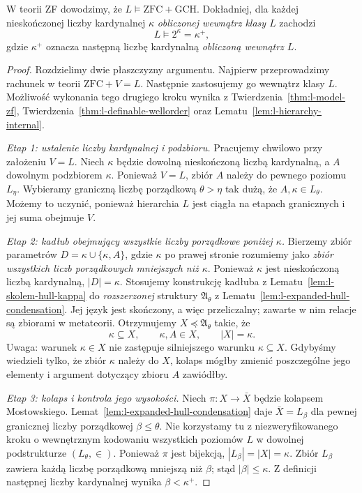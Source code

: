 \begin{twierdzenie}
\label{thm:l-gch}
W teorii ZF dowodzimy, że $L\models\mathrm{ZFC}+\mathrm{GCH}$.
Dokładniej, dla każdej nieskończonej liczby kardynalnej
$\kappa$ \emph{obliczonej wewnątrz klasy $L$} zachodzi
\[
 L\models 2^\kappa=\kappa^+,
\]
gdzie $\kappa^+$ oznacza następną liczbę kardynalną
\emph{obliczoną wewnątrz $L$}.
\end{twierdzenie}
\begin{proof}
Rozdzielimy dwie płaszczyzny argumentu. Najpierw
przeprowadzimy rachunek w teorii $\mathrm{ZFC}+V=L$.
Następnie zastosujemy go wewnątrz klasy $L$.
Możliwość wykonania tego drugiego kroku wynika
z Twierdzenia~\ref{thm:l-model-zf},
Twierdzenia~\ref{thm:l-definable-wellorder} oraz
Lematu~\ref{lem:l-hierarchy-internal}.

\emph{Etap 1: ustalenie liczby kardynalnej i podzbioru.}
Pracujemy chwilowo przy założeniu $V=L$. Niech $\kappa$
będzie dowolną nieskończoną liczbą kardynalną,
a $A$ dowolnym podzbiorem $\kappa$. Ponieważ $V=L$,
zbiór $A$ należy do pewnego poziomu $L_\eta$.
Wybieramy graniczną liczbę porządkową $\theta>\eta$
tak dużą, że $A,\kappa\in L_\theta$.
Możemy to uczynić, ponieważ hierarchia $L$ jest
ciągła na etapach granicznych i jej suma obejmuje $V$.

\emph{Etap 2: kadłub obejmujący wszystkie liczby
porządkowe poniżej $\kappa$.}
Bierzemy zbiór parametrów
$D=\kappa\cup\{\kappa,A\}$, gdzie $\kappa$ po prawej
stronie rozumiemy jako \emph{zbiór wszystkich liczb
porządkowych mniejszych niż $\kappa$}.
Ponieważ $\kappa$ jest nieskończoną liczbą kardynalną,
$|D|=\kappa$. Stosujemy konstrukcję kadłuba z
Lematu~\ref{lem:l-skolem-hull-kappa} do
\emph{rozszerzonej} struktury $\mathfrak A_\theta$
z Lematu~\ref{lem:l-expanded-hull-condensation}.
Jej język jest skończony, a więc przeliczalny;
zawarte w nim relacje są zbiorami w metateorii.
Otrzymujemy $X\preccurlyeq\mathfrak A_\theta$ takie, że
\[
 \kappa\subseteq X,\qquad \kappa,A\in X,
 \qquad |X|=\kappa.
\]
Uwaga: warunek $\kappa\in X$ nie zastępuje
silniejszego warunku $\kappa\subseteq X$.
Gdybyśmy wiedzieli tylko, że zbiór $\kappa$ należy
do $X$, kolaps mógłby zmienić poszczególne jego
elementy i argument dotyczący zbioru $A$ zawiódłby.

\emph{Etap 3: kolaps i kontrola jego wysokości.}
Niech $\pi:X\to\bar X$ będzie kolapsem Mostowskiego.
Lemat~\ref{lem:l-expanded-hull-condensation} daje
$\bar X=L_\beta$ dla pewnej granicznej liczby porządkowej
$\beta\le\theta$. Nie korzystamy tu z niezweryfikowanego
kroku o wewnętrznym kodowaniu wszystkich poziomów $L$
w dowolnej podstrukturze $(L_\theta,\in)$. Ponieważ $\pi$ jest bijekcją,
$|L_\beta|=|X|=\kappa$. Zbiór $L_\beta$ zawiera
każdą liczbę porządkową mniejszą niż $\beta$;
stąd $|\beta|\le\kappa$. Z definicji następnej
liczby kardynalnej wynika $\beta<\kappa^+$.


\end{proof}

